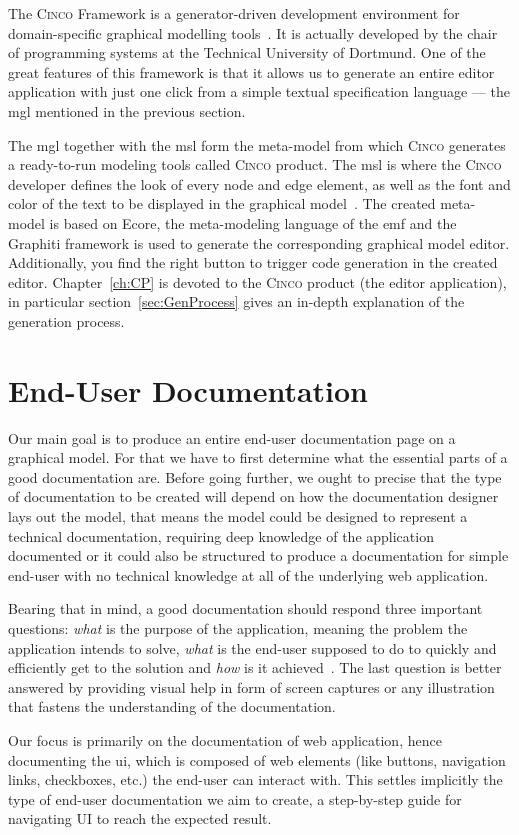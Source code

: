 The \textsc{Cinco} Framework is a generator-driven development environment for domain-specific graphical modelling tools~\cite{Cinco}. It is actually developed by the chair of programming systems at the Technical University of Dortmund. One of the great features of this framework is that it allows us to generate an entire editor application with just one click from a simple textual specification language --- the \acrfull{mgl} mentioned in the previous section. 

The \acrshort{mgl} together with the \acrshort{msl} form the meta-model from which \textsc{Cinco} generates a ready-to-run modeling tools called \textsc{Cinco} product. The \acrshort{msl} is where the \textsc{Cinco} developer defines the look of every node and edge element, as well as the font and color of the text to be displayed in the graphical model~\cite{naujokat-diss}. The created meta-model is based on Ecore, the meta-modeling language of the \acrfull{emf} and the Graphiti framework is used to generate the corresponding graphical model editor. Additionally, you find the right button to trigger code generation in the created editor. Chapter~\ref{ch:CP} is devoted to the \textsc{Cinco} product (the editor application), in particular section~\ref{sec:GenProcess} gives an in-depth explanation of the generation process.



\section{End-User Documentation}\label{sec:endUserDoc}

Our main goal is to produce an entire end-user documentation page on a graphical model. For that we have to first determine what the essential parts of a good documentation are. Before going further, we ought to precise that the type of documentation to be created will depend on how the documentation designer lays out the model, that means the model could be designed to represent a technical documentation, requiring deep knowledge of the application documented or it could also be structured to produce a documentation for simple end-user with no technical knowledge at all of the underlying web application.

Bearing that in mind, a good documentation should respond three important questions: \textit{what} is the purpose of the application, meaning the problem the application intends to solve, \textit{what} is the end-user supposed to do to quickly and efficiently get to the solution and \textit{how} is it achieved~\cite{5712775}. The last question is better answered by providing visual help in form of screen captures or any illustration that fastens the understanding of the documentation.

Our focus is primarily on the documentation of web application, hence documenting the \acrfull{ui}, which is composed of web elements (like buttons, navigation links, checkboxes, etc.) the end-user can interact with. This settles implicitly the type of end-user documentation we aim to create, a step-by-step guide for navigating UI to reach the expected result. 
